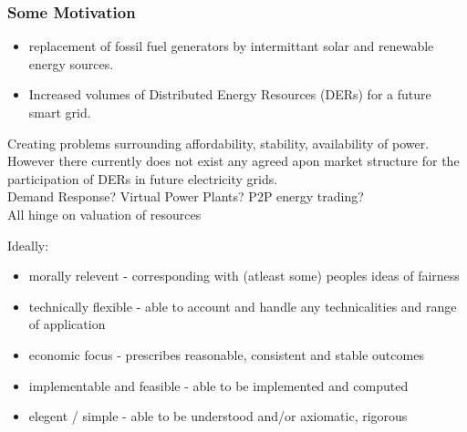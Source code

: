\begin{frame}
\frametitle{Some Motivation}
\begin{itemize}
\item	replacement of fossil fuel generators by intermittant solar and renewable energy sources.
\item	Increased volumes of Distributed Energy Resources (DERs) for a future smart grid.
\end{itemize}
Creating problems surrounding affordability, stability, availability of power.
However there currently does not exist any agreed apon market structure for the participation of DERs in future electricity grids.\\

Demand Response? Virtual Power Plants? P2P energy trading?\\
All hinge on valuation of resources
\end{frame}

\begin{frame}
Ideally:
\begin{itemize}
\item	morally relevent - corresponding with (atleast some) peoples ideas of fairness
\item	technically flexible - able to account and handle any technicalities and range of application
\item	economic focus - prescribes reasonable, consistent and stable outcomes
\item	implementable and feasible - able to be implemented and computed
\item	elegent / simple - able to be understood and/or axiomatic, rigorous
\end{itemize}
\end{frame}







